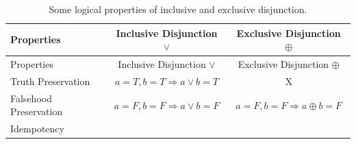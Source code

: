 \documentclass[oneside]{report}
\theoremstyle{definition}
\theoremstyle{definition}
\theoremstyle{definition}
\theoremstyle{remark}
\begin{document}
\begin{longtable}[]{@{}lcc@{}}
\caption{\label{tab:logicalproperties} Some logical properties of inclusive
and exclusive disjunction.}\tabularnewline
\toprule
\begin{minipage}[b]{0.30\columnwidth}\raggedright\strut
Properties\strut
\end{minipage} & \begin{minipage}[b]{0.33\columnwidth}\centering\strut
Inclusive Disjunction \(\lor\)\strut
\end{minipage} & \begin{minipage}[b]{0.28\columnwidth}\centering\strut
Exclusive Disjunction \(\oplus\)\strut
\end{minipage}\tabularnewline
\midrule
\endfirsthead
\toprule
\begin{minipage}[b]{0.30\columnwidth}\raggedright\strut
Properties\strut
\end{minipage} & \begin{minipage}[b]{0.33\columnwidth}\centering\strut
Inclusive Disjunction \(\lor\)\strut
\end{minipage} & \begin{minipage}[b]{0.28\columnwidth}\centering\strut
Exclusive Disjunction \(\oplus\)\strut
\end{minipage}\tabularnewline
\midrule
\endhead
\begin{minipage}[t]{0.30\columnwidth}\raggedright\strut
Truth Preservation\strut
\end{minipage} & \begin{minipage}[t]{0.33\columnwidth}\centering\strut
\(a=T,b=T \Rightarrow a \lor b = T\)\strut
\end{minipage} & \begin{minipage}[t]{0.28\columnwidth}\centering\strut
X\strut
\end{minipage}\tabularnewline
\begin{minipage}[t]{0.30\columnwidth}\raggedright\strut
Falsehood Preservation\strut
\end{minipage} & \begin{minipage}[t]{0.33\columnwidth}\centering\strut
\(a=F, b=F \Rightarrow a \lor b = F\)\strut
\end{minipage} & \begin{minipage}[t]{0.28\columnwidth}\centering\strut
\(a=F, b=F \Rightarrow a \oplus b = F\)\strut
\end{minipage}\tabularnewline
\begin{minipage}[t]{0.30\columnwidth}\raggedright\strut
Idempotency\strut

\end{minipage}
\end{longtable}
\end{document}
